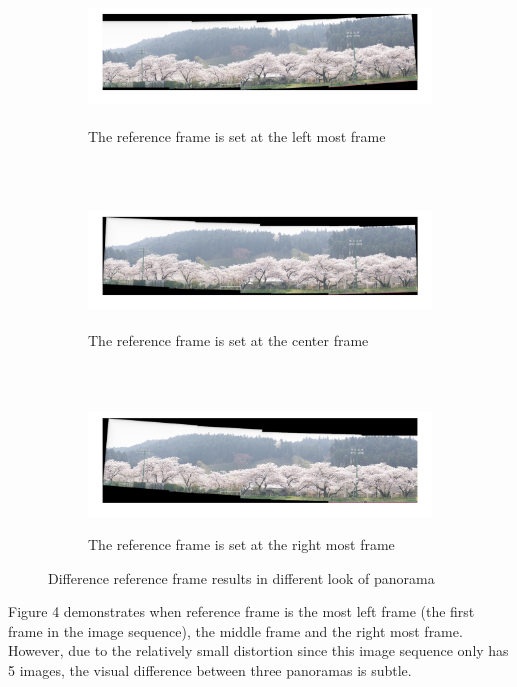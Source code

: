 \documentclass[12pt]{article}
\begin{document}
\begin{figure}[h]
	\centering
		\begin{subfigure}{1\textwidth}
		\centering
			\includegraphics[height=3.5cm, width=15cm]{ref1}
			\caption{The reference frame is set at the left most frame}
			\label{fig:ref1}
		\end{subfigure}
		~
		\begin{subfigure}{1\textwidth}
		\centering
			\includegraphics[height=3.5cm, width=15cm]{ref3}
			\caption{The reference frame is set at the center frame}
			\label{fig:ref3}
		\end{subfigure}
		~
				\begin{subfigure}{1\textwidth}
		\centering
			\includegraphics[height=3.5cm, width=15cm]{ref5}
			\caption{The reference frame is set at the right most frame}
			\label{fig:ref5}
		\end{subfigure}
		\caption{Difference reference frame results in different look of panorama}
\end{figure}
Figure 4 demonstrates when reference frame is the most left frame (the first frame in the image sequence), the middle frame and the right most frame. However, due to the relatively small distortion since this image sequence only has 5 images, the visual difference between three panoramas is subtle. 
\end{document}
